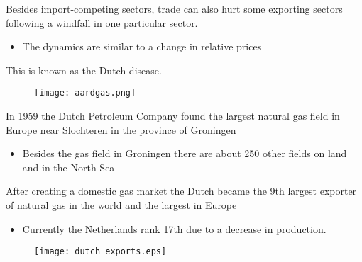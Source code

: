 \documentclass{beamer}
\begin{document}
\begin{frame}
 Besides import-competing sectors, trade can also hurt some exporting sectors following a windfall in one particular sector.
 \begin{itemize}
  \item The dynamics are similar to a change in relative prices
 \end{itemize}
 \medskip
 This is known as the Dutch disease.
\end{frame}


\begin{frame}
  \begin{figure}
    \texttt{[image: aardgas.png]}
  \end{figure}
\end{frame}

\begin{frame}
 In 1959 the Dutch Petroleum Company found the largest natural gas field in Europe near Slochteren in the province of Groningen
 \begin{itemize}
   \item Besides the gas field in Groningen there are about 250 other fields on land and in the North Sea
 \end{itemize}
 \medskip
 After creating a domestic gas market the Dutch became the 9th largest exporter of natural gas in the world and the largest in Europe
 \begin{itemize}
  \item Currently the Netherlands rank 17th due to a decrease in production.
 \end{itemize}
\end{frame}

\begin{frame}
  \begin{figure}
    \texttt{[image: dutch\_exports.eps]}
  \end{figure}
\end{frame}
\end{document}
